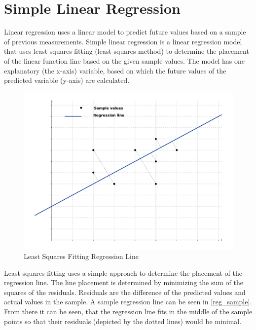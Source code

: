 \section{Simple Linear Regression}

Linear regression uses a linear model to predict future values based on a sample of previous measurements. Simple linear regression is a linear regression model that uses least squares fitting (least squares method) \cite{least_squres} to determine the placement of the linear function line based on the given sample values. The model has one explanatory (the x-axis) variable, based on which the future values of the predicted variable (y-axis) are calculated.

\begin{figure}[h]
\centering
\includegraphics[scale=0.7]{2/figures/regression_sample.pdf}
\caption{Least Squares Fitting Regression Line}
\label{reg_sample}
\end{figure}

Least squares fitting uses a simple approach to determine the placement of the regression line. The line placement is determined by minimizing the sum of the squares of the residuals. Residuals are the difference of the predicted values and actual values in the sample. A sample regression line can be seen in \autoref{reg_sample}. From there it can be seen, that the regression line fits in the middle of the sample points so that their residuals (depicted by the dotted lines) would be minimal. 

